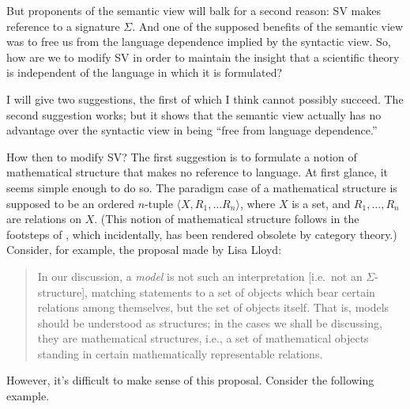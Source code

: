 But proponents of the semantic view will balk for a second reason: SV
makes reference to a signature $\Sigma$.  And one of the supposed
benefits of the semantic view was to free us from the language
dependence implied by the syntactic view.  So, how are we to modify SV
in order to maintain the insight that a scientific theory is
independent of the language in which it is formulated?

I will give two suggestions, the first of which I think cannot
possibly succeed.  The second suggestion works; but it shows that the
semantic view actually has no advantage over the syntactic view in
being ``free from language dependence.''

How then to modify SV?  The first suggestion is to formulate a notion
of mathematical structure that makes no reference to language.  At
first glance, it seems simple enough to do so.  The paradigm case of a
mathematical structure is supposed to be an ordered $n$-tuple
$\langle X,R_1,\dots R_n\rangle$, where $X$ is a set, and
$R_1,\dots ,R_n$ are relations on $X$.  (This notion of mathematical
structure follows in the footsteps of \cite{bourbaki}, which
incidentally, has been rendered obsolete by category theory.)
Consider, for example, the proposal made by Lisa Lloyd:
\begin{quote}
  In our discussion, a {\it model} is not such an interpretation
  [i.e.\ not an $\Sigma$-structure], matching statements to a set of
  objects which bear certain relations among themselves, but the set
  of objects itself.  That is, models should be understood as
  structures; in the cases we shall be discussing, they are
  mathematical structures, i.e., a set of mathematical objects
  standing in certain mathematically representable
  relations. \citep[p.\ 30]{lloyd}
\end{quote}
However, it's difficult to make sense of this proposal.  Consider the
following example.

